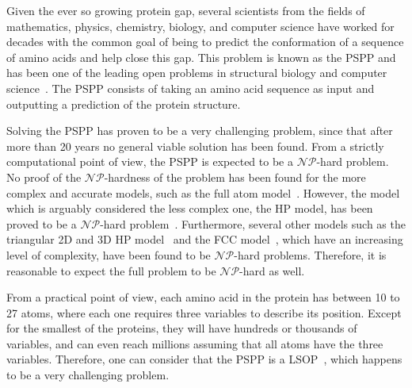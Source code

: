 Given the ever so growing protein gap, several scientists from the fields of
mathematics, physics, chemistry, biology, and computer science have worked for
decades with the common goal of being to predict the conformation of a sequence
of amino acids and help close this gap. This problem is known as the
\ac{PSPP} and has been one of the leading open problems
in structural biology and computer science~\cite{dorn2014three}. The \ac{PSPP} consists of
taking an amino acid sequence as input and outputting a prediction of the protein structure.

Solving the \ac{PSPP} has proven to be a very challenging problem, since that
after more than 20 years no general viable solution has been found. From a
strictly computational point of view, the \ac{PSPP} is expected to be a
$\mathcal{NP}$-hard problem. No proof of the $\mathcal{NP}$-hardness of the
problem has been found for the more complex and accurate models, such as the
full atom model~\cite{rohl2004protein}. However, the model which is arguably
considered the less complex one, the \ac{HP} model, has been proved to be a
$\mathcal{NP}$-hard problem~\cite{berger1998protein}. Furthermore, several
other models such as the triangular 2D and 3D \ac{HP}
model~\cite{agarwala1997local} and the \ac{FCC} model~\cite{hoque2007protein},
which have an increasing level of complexity, have been found to be
$\mathcal{NP}$-hard problems.  Therefore, it is reasonable to expect the full
problem to be $\mathcal{NP}$-hard as well.

From a practical point of view, each amino acid in the protein has between 10
to 27 atoms, where each one requires three variables to describe its position.
Except for the smallest of the proteins, they will have hundreds or thousands
of variables, and can even reach millions assuming that all atoms have the
three variables. Therefore, one can consider that the \ac{PSPP} is a
\ac{LSOP}~\cite{mahdavi2015metaheuristics}, which happens to be a very
challenging problem.


